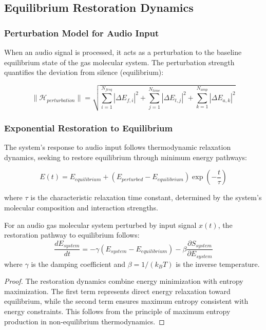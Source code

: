 \subsection{Equilibrium Restoration Dynamics}

\subsubsection{Perturbation Model for Audio Input}

When an audio signal is processed, it acts as a perturbation to the baseline equilibrium state of the gas molecular system. The perturbation strength quantifies the deviation from silence (equilibrium):

\begin{equation}
\|\mathcal{H}_{perturbation}\| = \sqrt{\sum_{i=1}^{N_{freq}} |\Delta E_{f,i}|^2 + \sum_{j=1}^{N_{time}} |\Delta E_{t,j}|^2 + \sum_{k=1}^{N_{amp}} |\Delta E_{a,k}|^2}
\end{equation}

\subsubsection{Exponential Restoration to Equilibrium}

The system's response to audio input follows thermodynamic relaxation dynamics, seeking to restore equilibrium through minimum energy pathways:

\begin{equation}
E(t) = E_{equilibrium} + (E_{perturbed} - E_{equilibrium}) \exp\left(-\frac{t}{\tau}\right)
\end{equation}

where $\tau$ is the characteristic relaxation time constant, determined by the system's molecular composition and interaction strengths.

\begin{theorem}
For an audio gas molecular system perturbed by input signal $x(t)$, the restoration pathway to equilibrium follows:
\begin{equation}
\frac{dE_{system}}{dt} = -\gamma (E_{system} - E_{equilibrium}) - \beta \frac{\partial S_{system}}{\partial E_{system}}
\end{equation}
where $\gamma$ is the damping coefficient and $\beta = 1/(k_B T)$ is the inverse temperature.
\end{theorem}

\begin{proof}
The restoration dynamics combine energy minimization with entropy maximization. The first term represents direct energy relaxation toward equilibrium, while the second term ensures maximum entropy consistent with energy constraints. This follows from the principle of maximum entropy production in non-equilibrium thermodynamics.
\end{proof}


